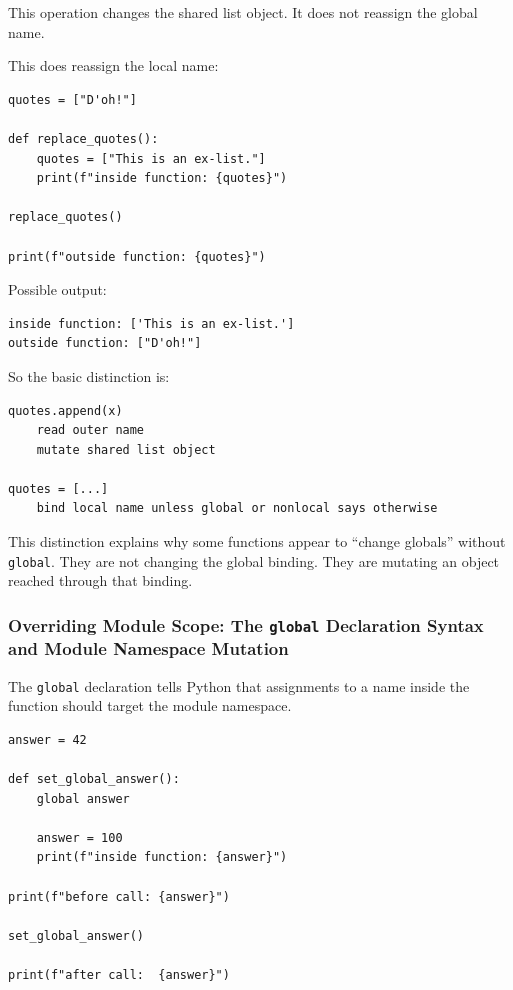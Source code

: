 This operation changes the shared list object. It does not reassign the global name.

This does reassign the local name:

\begin{verbatim}
quotes = ["D'oh!"]

def replace_quotes():
    quotes = ["This is an ex-list."]
    print(f"inside function: {quotes}")

replace_quotes()

print(f"outside function: {quotes}")
\end{verbatim}

Possible output:

\begin{verbatim}
inside function: ['This is an ex-list.']
outside function: ["D'oh!"]
\end{verbatim}

So the basic distinction is:

\begin{verbatim}
quotes.append(x)
    read outer name
    mutate shared list object

quotes = [...]
    bind local name unless global or nonlocal says otherwise
\end{verbatim}

This distinction explains why some functions appear to ``change globals'' without \texttt{global}. They are not changing the global binding. They are mutating an object reached through that binding.

\subsubsection{Overriding Module Scope: The \texttt{global} Declaration Syntax and Module Namespace Mutation}

The \texttt{global} declaration tells Python that assignments to a name inside the function should target the module namespace.

\begin{verbatim}
answer = 42

def set_global_answer():
    global answer

    answer = 100
    print(f"inside function: {answer}")

print(f"before call: {answer}")

set_global_answer()

print(f"after call:  {answer}")
\end{verbatim}


